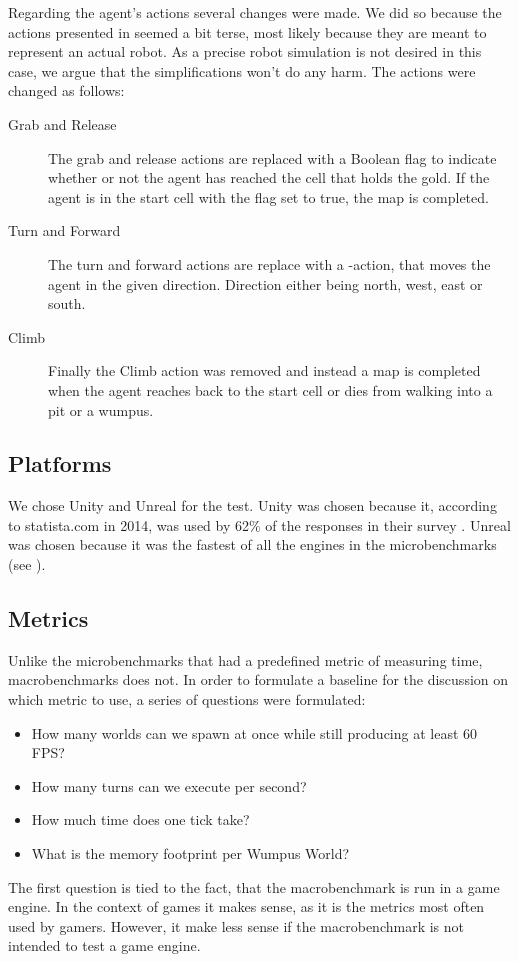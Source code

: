 Regarding the agent's actions several changes were made. We did so because the actions presented in \cite{wumpus:world} seemed a bit terse, most likely because they are meant to represent an actual robot. As a precise robot simulation is not desired in this case, we argue that the simplifications won't do any harm. The actions were changed as follows:
\begin{description}
    \item[Grab and Release] The grab and release actions are replaced with a Boolean flag to indicate whether or not the agent has reached the cell that holds the gold. If the agent is in the start cell with the flag set to true, the map is completed.
    \item[Turn and Forward] The turn and forward actions are replace with a -action, that moves the agent in the given direction. Direction either being north, west, east or south.
    \item[Climb] Finally the Climb action was removed and instead a map is completed when the agent reaches back to the start cell or dies from walking into a pit or a wumpus.
\end{description}

\subsection{Platforms}
We chose Unity and Unreal for the test. Unity was chosen because it, according to statista.com in 2014, was used by 62\% of the responses in their survey \cite{gameengine:statista}.
Unreal was chosen because it was the fastest of all the engines in the microbenchmarks (see ).


\subsection{Metrics}
Unlike the microbenchmarks that had a predefined metric of measuring time, macrobenchmarks does not. In order to formulate a baseline for the discussion on which metric to use, a series of questions were formulated:
\begin{itemize}
    \item How many worlds can we spawn at once while still producing at least 60 \ac{FPS}?
    \item How many turns can we execute per second?
    \item How much time does one tick take?
    \item What is the memory footprint per Wumpus World?
\end{itemize}
The first question is tied to the fact, that the macrobenchmark is run in a game engine. In the context of games it makes sense, as it is the metrics most often used by gamers. However, it make less sense if the macrobenchmark is not intended to test a game engine.

